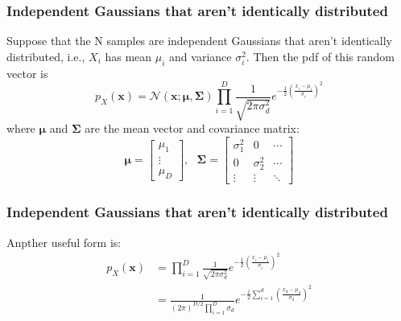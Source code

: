 \documentclass{beamer}
\begin{document}
\begin{frame}
  \frametitle{Independent Gaussians that aren’t identically distributed}

  Suppose that the N samples are independent Gaussians that aren't
  identically distributed, i.e., $X_i$ has mean $\mu_i$ and variance
  $\sigma_i^2$.  Then the pdf of this random vector is
  \begin{displaymath}
    p_X(\mathbf{x}) = \mathcal{N}(\mathbf{x};\bm{\mu},\mathbf{\Sigma})
    \prod_{i=1}^D\frac{1}{\sqrt{2\pi\sigma_d^2}}e^{-\frac{1}{2}\left(\frac{x_i-\mu_i}{\sigma_i}\right)^2}
  \end{displaymath}
  where $\bm{\mu}$ and $\mathbf{\Sigma}$ are the mean vector and
  covariance matrix:
  \begin{displaymath}
    \bm{\mu}=\left[\begin{array}{c}\mu_1\\\vdots\\\mu_D\end{array}\right],~~~
    \mathbf{\Sigma}=\left[\begin{array}{ccc}\sigma_1^2&0&\cdots\\
        0&\sigma_2^2&\cdots\\\vdots&\vdots&\ddots\end{array}\right]
  \end{displaymath}
\end{frame}

\begin{frame}
  \frametitle{Independent Gaussians that aren’t identically distributed}

  Anpther useful form is:
  \begin{align*}
    p_X(\mathbf{x})
    &=
    \prod_{i=1}^D\frac{1}{\sqrt{2\pi\sigma_d^2}}e^{-\frac{1}{2}\left(\frac{x_i-\mu_i}{\sigma_i}\right)^2}\\
    &=
    \frac{1}{(2\pi)^{D/2}\prod_{i=1}^D\sigma_d}e^{-\frac{1}{2}\sum_{i=1}^d\left(\frac{x_d-\mu_d}{\sigma_d}\right)^2}
  \end{align*}
\end{frame}
\end{document}
